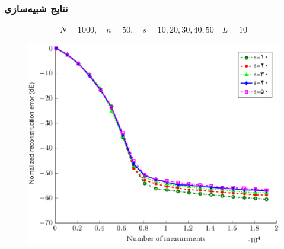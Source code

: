 \begin{frame}
\frametitle{نتایج شبیه‌سازی}
\begin{align*}
N= 1000, \quad n= 50, \quad s= 10,20,30,40,50 \quad L=10
\end{align*}
\begin{figure}
	\centering
	\includegraphics[scale=0.25]{Images/simfig2.eps}
\end{figure}
\end{frame}
